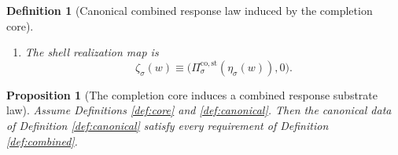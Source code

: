 \documentclass[11pt]{article}
\newcommand{\DataSpace}[1]{\mathcal Y_{#1}^{\mathrm{obs}}}
\newcommand{\AmbientTarget}[1]{E_{#1}^{\mathrm{amb}}}
\newcommand{\GapSpace}[1]{H_{#1}}
\newcommand{\ResponseSym}[1]{\mathbb H_{#1}}
\newcommand{\ResponseTime}[1]{\rho_{#1}}
\newcommand{\ProtoEmbed}[1]{\zeta_{#1}}
\newcommand{\CoreStateProj}[1]{\Pi_{#1}^{\mathrm{co,st}}}
\newcommand{\CoreSym}[1]{\mathbb K_{#1}^{\mathrm{co}}}
\newcommand{\CoreTime}[1]{\tau_{#1}^{\mathrm{co}}}
\newcommand{\CoreEmbed}[1]{\eta_{#1}}
\newtheorem{definition}{Definition}
\newtheorem{proposition}{Proposition}
\begin{document}
\begin{definition}[Canonical combined response law induced by the completion core]
\begin{enumerate}
    \[
    \ResponseSym{\sigma}
    \equiv
    \left\{
    (g_{\mathrm{dat}},g_{\mathrm{sh}},g_{\mathrm{hid}}):
    (g_{\mathrm{st}},g_{\mathrm{dat}},g_{\mathrm{sh}},g_{\mathrm{hid}})
    \in \CoreSym{\sigma}
    \right\},
    \]
    \[
    \ResponseTime{\sigma}
    \equiv
    \bigl(
    \CoreTime{\sigma}\big|_{\DataSpace{\sigma}},
    \CoreTime{\sigma}\big|_{\AmbientTarget{\sigma}},
    \CoreTime{\sigma}\big|_{\GapSpace{\sigma}}
    \bigr).
    \]
    \item The shell realization map is
    \begin{equation}
    \ProtoEmbed{\sigma}(w)
    \equiv
    \bigl(
    \CoreStateProj{\sigma}(\CoreEmbed{\sigma}(w)),
    0
    \bigr).
    \label{eq:protoembed}
    \end{equation}
\end{enumerate}
\end{definition}

\begin{proposition}[The completion core induces a combined response substrate law]
\label{prop:combined}
Assume Definitions \ref{def:core} and \ref{def:canonical}. Then the canonical data of Definition \ref{def:canonical} satisfy every requirement of Definition \ref{def:combined}.
\end{proposition}
\end{document}
